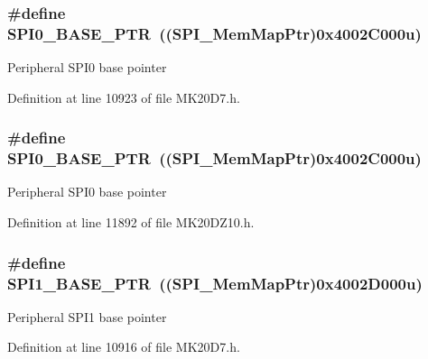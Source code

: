 \subsubsection[{\texorpdfstring{S\+P\+I0\+\_\+\+B\+A\+S\+E\+\_\+\+P\+TR}{SPI0_BASE_PTR}}]{\setlength{\rightskip}{0pt plus 5cm}\#define S\+P\+I0\+\_\+\+B\+A\+S\+E\+\_\+\+P\+TR~(({\bf S\+P\+I\+\_\+\+Mem\+Map\+Ptr})0x4002\+C000u)}\hypertarget{group___s_p_i___peripheral_ga851f64a97b5919c1f99a34db5918b3b4}{}\label{group___s_p_i___peripheral_ga851f64a97b5919c1f99a34db5918b3b4}
Peripheral S\+P\+I0 base pointer 

Definition at line 10923 of file M\+K20\+D7.\+h.

\subsubsection[{\texorpdfstring{S\+P\+I0\+\_\+\+B\+A\+S\+E\+\_\+\+P\+TR}{SPI0_BASE_PTR}}]{\setlength{\rightskip}{0pt plus 5cm}\#define S\+P\+I0\+\_\+\+B\+A\+S\+E\+\_\+\+P\+TR~(({\bf S\+P\+I\+\_\+\+Mem\+Map\+Ptr})0x4002\+C000u)}\hypertarget{group___s_p_i___peripheral_ga851f64a97b5919c1f99a34db5918b3b4}{}\label{group___s_p_i___peripheral_ga851f64a97b5919c1f99a34db5918b3b4}
Peripheral S\+P\+I0 base pointer 

Definition at line 11892 of file M\+K20\+D\+Z10.\+h.

\subsubsection[{\texorpdfstring{S\+P\+I1\+\_\+\+B\+A\+S\+E\+\_\+\+P\+TR}{SPI1_BASE_PTR}}]{\setlength{\rightskip}{0pt plus 5cm}\#define S\+P\+I1\+\_\+\+B\+A\+S\+E\+\_\+\+P\+TR~(({\bf S\+P\+I\+\_\+\+Mem\+Map\+Ptr})0x4002\+D000u)}\hypertarget{group___s_p_i___peripheral_gae28fd789e0602a32076c1c13ca39f5af}{}\label{group___s_p_i___peripheral_gae28fd789e0602a32076c1c13ca39f5af}
Peripheral S\+P\+I1 base pointer 

Definition at line 10916 of file M\+K20\+D7.\+h.

